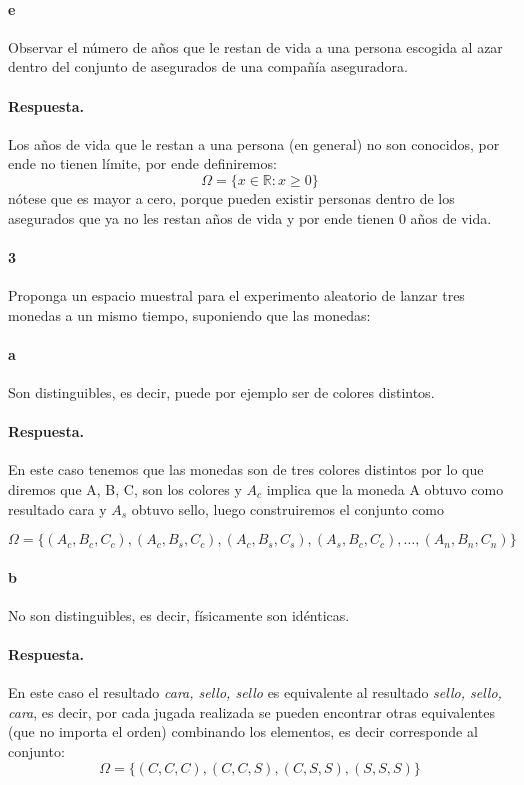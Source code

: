 \documentclass{article}
\begin{document}
\paragraph{e} Observar el número de años que le restan de vida a una persona escogida al azar dentro del conjunto de asegurados de una compañía aseguradora.
\paragraph{Respuesta.} Los años de vida que le restan a una persona (en general) no son conocidos, por ende no tienen límite, por ende definiremos:
$$\Omega = \{ x \in \mathbb{R}:x \geq 0 \}$$
nótese que es mayor a cero, porque pueden existir personas dentro de los asegurados que ya no les restan años de vida y por ende tienen $0$ años de vida.
\paragraph{3} Proponga un espacio muestral para el experimento aleatorio de lanzar tres monedas a un mismo tiempo, suponiendo que las monedas:
\paragraph{a} Son distinguibles, es decir, puede por ejemplo ser de colores distintos.
\paragraph{Respuesta.} En este caso tenemos que las monedas son de tres colores distintos por lo que diremos que A, B, C, son los colores y $A_c$ implica que la moneda A obtuvo como resultado cara y $A_s$ obtuvo sello, luego construiremos el conjunto como

$$\Omega = \{(A_c, B_c, C_c), (A_c, B_s, C_c), (A_c, B_s, C_s), (A_s, B_c, C_c), \dots, (A_n, B_n, C_n)\}$$
\paragraph{b}No son distinguibles, es decir, físicamente son idénticas.
\paragraph{Respuesta.} En este caso el resultado \textit{cara, sello, sello} es equivalente al resultado \textit{sello, sello, cara}, es decir, por cada jugada realizada se pueden encontrar otras equivalentes (que no importa el orden) combinando los elementos, es decir corresponde al conjunto:
$$\Omega = \{ (C,C,C), (C,C,S), (C,S,S), (S,S,S) \}$$
\end{document}
